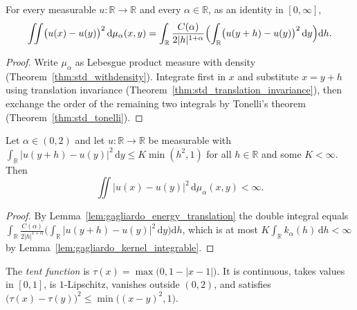 \begin{lemma}\label{lem:gagliardo_energy_translation}
\leanok
For every measurable $u : \mathbb{R} \to \mathbb{R}$ and every $\alpha \in \mathbb{R}$, as an identity in $[0, \infty]$,
\[
  \iint \bigl(u(x) - u(y)\bigr)^2 \, \mathrm{d}\mu_\alpha(x, y)
  = \int_{\mathbb{R}} \frac{C(\alpha)}{2 \lvert h \rvert^{1 + \alpha}} \Bigl( \int_{\mathbb{R}} \bigl(u(y + h) - u(y)\bigr)^2 \, \mathrm{d}y \Bigr) \mathrm{d}h.
\]
\end{lemma}

\begin{proof}
\leanok
Write $\mu_\alpha$ as Lebesgue product measure with density (Theorem~\ref{thm:std_withdensity}). Integrate first in $x$ and substitute $x = y + h$ using translation invariance (Theorem~\ref{thm:std_translation_invariance}), then exchange the order of the remaining two integrals by Tonelli's theorem (Theorem~\ref{thm:std_tonelli}).
\end{proof}

\begin{theorem}\label{thm:translation_criterion}
\leanok
Let $\alpha \in (0, 2)$ and let $u : \mathbb{R} \to \mathbb{R}$ be measurable with $\int_{\mathbb{R}} \lvert u(y + h) - u(y) \rvert^2 \, \mathrm{d}y \le K \min(h^2, 1)$ for all $h \in \mathbb{R}$ and some $K < \infty$. Then
\[
  \iint \lvert u(x) - u(y) \rvert^2 \, \mathrm{d}\mu_\alpha(x, y) < \infty.
\]
\end{theorem}

\begin{proof}
\leanok
By Lemma~\ref{lem:gagliardo_energy_translation} the double integral equals $\int_{\mathbb{R}} \tfrac{C(\alpha)}{2 \lvert h \rvert^{1 + \alpha}} \bigl( \int_{\mathbb{R}} \lvert u(y + h) - u(y) \rvert^2 \, \mathrm{d}y \bigr) \mathrm{d}h$, which is at most $K \int_{\mathbb{R}} k_\alpha(h) \, \mathrm{d}h < \infty$ by Lemma~\ref{lem:gagliardo_kernel_integrable}.
\end{proof}

\begin{definition}\label{def:gagliardo_tent}
\leanok
The \emph{tent function} is $\tau(x) = \max\bigl(0, 1 - \lvert x - 1 \rvert\bigr)$. It is continuous, takes values in $[0, 1]$, is $1$-Lipschitz, vanishes outside $(0, 2)$, and satisfies $\bigl(\tau(x) - \tau(y)\bigr)^2 \le \min\bigl((x - y)^2, 1\bigr)$.
\end{definition}

